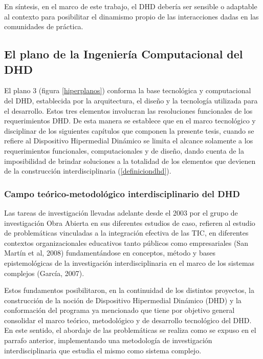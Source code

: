 En síntesis, en el marco de este trabajo, el DHD debería ser sensible o adaptable al contexto para posibilitar el
dinamismo propio de las interacciones dadas en las comunidades de práctica.


\subsection{El plano de la Ingeniería Computacional del DHD} \label{plano3}

El plano 3 (figura \ref{hiperplanos}) conforma la base tecnológica y
computacional del DHD, establecida por la arquitectura, el diseño y la
tecnología utilizada para el desarrollo. Estos tres elementos involucran las
resoluciones funcionales de los requerimientos DHD. 
De esta manera se establece que en el marco tecnológico y disciplinar de los siguientes capítulos que componen la presente tesis, cuando se refiere al
Dispositivo Hipermedial Dinámico se limita el alcance solamente a los requerimientos
funcionales, computacionales y de diseño, dando cuenta de la imposibilidad de brindar soluciones a la totalidad de los elementos que devienen de la construcción interdisciplinaria (\ref{definiciondhd}).


\subsubsection{Campo teórico-metodológico interdisciplinario del DHD}

Las tareas de investigación llevadas adelante desde el 2003 por el grupo de
investigación Obra Abierta en sus diferentes estudios de caso, refieren al estudio de problemáticas vinculadas a la integración efectiva
de las TIC, en diferentes contextos organizacionales educativos tanto públicos
como empresariales (San Martín et al, 2008) fundamentándose en conceptos, método
y bases epistemológicas de la investigación interdisciplinaria en el marco de
los sistemas complejos (García, 2007).

Estos fundamentos posibilitaron, en la continuidad de los distintos proyectos,
la construcción de la noción de Dispositivo Hipermedial Dinámico (DHD) y la
conformación del programa ya mencionado que tiene por objetivo
general consolidar el marco teórico, metodológico y de desarrollo tecnológico
del DHD. En este sentido, el abordaje de las problemáticas se realiza como se expuso en el parrafo anterior, implementando una
metodología de investigación interdisciplinaria que estudia el mismo como
sistema complejo.


